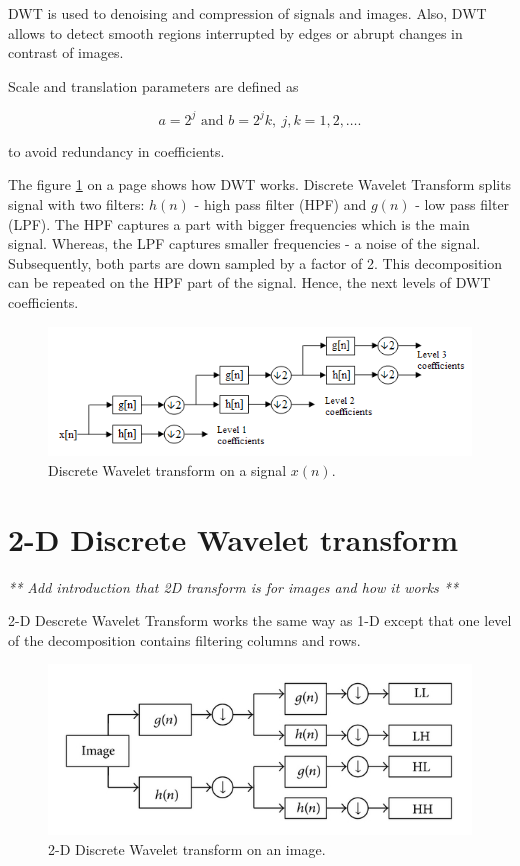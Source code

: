 DWT is used to denoising and compression of signals and images. Also, DWT allows to detect smooth regions interrupted by edges or abrupt changes in contrast of images.

Scale and translation parameters are defined as

\begin{equation}
a = 2^j \text{ and } b = 2^j k,\ j,k=1,2,\ldots.
\end{equation}

to avoid redundancy in coefficients.


The figure \ref{fig:DWT} on a page \pageref{fig:DWT} shows how DWT works. Discrete Wavelet Transform splits signal with two filters: $h(n)$ - high pass filter (HPF) and $g(n)$ - low pass filter (LPF). The HPF captures a part with bigger frequencies which is the main signal. Whereas, the LPF captures smaller frequencies - a noise of the signal. Subsequently, both parts are down sampled by a factor of 2. This decomposition can be repeated on the HPF part of the signal. Hence, the next levels of DWT coefficients.

\begin{figure}[h]
	\centering
	\includegraphics[width=\textwidth]{DWT.png}
	\caption{Discrete Wavelet transform on a signal $x(n)$.}
	\label{fig:DWT}
\end{figure}


\section{2-D Discrete Wavelet transform}

\textit{** Add introduction that 2D transform is for images and how it works **}

2-D Descrete Wavelet Transform works the same way as 1-D except that one level of the decomposition contains filtering columns and rows.

\begin{figure}[h]
	\centering
	\includegraphics[width=\textwidth]{2D_DWT.JPG}
	\caption{2-D Discrete Wavelet transform on an image.}
	\label{fig:2D_DWT}
\end{figure}







